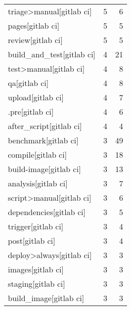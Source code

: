 \begin{tabular}{lrr}
triage>manual[gitlab ci]                   &                   5 &             6 \\
pages[gitlab ci]                           &                   5 &             5 \\
review[gitlab ci]                          &                   5 &             5 \\
build\_and\_test[gitlab ci]                  &                   4 &            21 \\
test>manual[gitlab ci]                     &                   4 &             8 \\
qa[gitlab ci]                              &                   4 &             8 \\
upload[gitlab ci]                          &                   4 &             7 \\
.pre[gitlab ci]                            &                   4 &             6 \\
after\_script[gitlab ci]                    &                   4 &             4 \\
benchmark[gitlab ci]                       &                   3 &            49 \\
compile[gitlab ci]                         &                   3 &            18 \\
build-image[gitlab ci]                     &                   3 &            13 \\
analysis[gitlab ci]                        &                   3 &             7 \\
script>manual[gitlab ci]                   &                   3 &             6 \\
dependencies[gitlab ci]                    &                   3 &             5 \\
trigger[gitlab ci]                         &                   3 &             4 \\
post[gitlab ci]                            &                   3 &             4 \\
deploy>always[gitlab ci]                   &                   3 &             3 \\
images[gitlab ci]                          &                   3 &             3 \\
staging[gitlab ci]                         &                   3 &             3 \\
build\_image[gitlab ci]                     &                   3 &             3 \\

\end{tabular}
